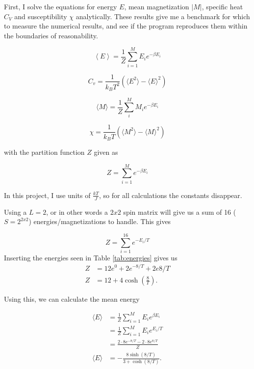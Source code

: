 \documentclass[10pt,showpacs,preprintnumbers,footinbib,amsmath,amssymb,aps,prl,twocolumn,groupedaddress,superscriptaddress,showkeys]{revtex4-1}
\newcommand{\suml}[2]{\sum\limits_{#1}^{#2}}
\newcommand{\Exp}[1]{e^{#1}}
\begin{document}
First, I solve the equations for energy $E$, mean magnetization $|M|$, specific heat $C_V$ and susceptibility $\chi$ analytically. These results give me a benchmark for which to measure the numerical results, and see if the program reproduces them within the boundaries of reasonability.

\begin{equation}
\left\langle E \right\rangle = \frac{1}{Z} \suml{i = 1}{M} E_i\Exp{-\beta E_i}
\label{eq:<E>}
\end{equation}

\begin{equation}
C_v = \frac{1}{k_B T^2}\left( \langle E^2 \rangle - \langle E \rangle ^2  \right)
\label{eq:C_V}
\end{equation}

\begin{equation}
\langle M \rangle = \frac{1}{Z}\suml{i}{M}M_i\Exp{-\beta E_i}
\label{eq:<M>}
\end{equation}

\begin{equation}
\chi = \frac{1}{k_B T}\left( \langle M^2 \rangle - \langle M \rangle ^2  \right)
\label{eq:chi}
\end{equation}

with the partition function $Z$ given as

\begin{equation}
Z = \sum_{i=1}^{M} e^{-\beta E_i}
\end{equation}



In this project, I use units of $\frac{k T}{J}$, so for all calculations the constants disappear.

Using a $L = 2$, or in other words a $2x2$ spin matrix will give us a sum of 16 ($S = 2^{2x2}$) energies/magnetizations to handle. This gives

$$
Z = \sum_{i=1}^{16} e^{-E_i/T}
$$
Inserting the energies seen in Table \ref{tab:energies} gives us
\begin{align*}
Z&= 12e^{0}+2e^{-8/T}+2e{8/T}\\
Z&= 12 + 4\cosh(\frac{8}{T}).
\end{align*}

Using this, we can calculate the mean energy

\begin{align*}
\langle E\rangle &=  \frac{1}{Z} \sum_{i=1}^{M} E_i e^{\beta E_i}\\
&= \frac{1}{Z} \sum_{i=1}^{M} E_i e^{E_i/T}\\
&= \frac{2\cdot 8e^{-8/T} -2\cdot 8e^{8/T}}{Z}\\
\langle E\rangle &= -\frac{8\sinh(8/T)}{3+\cosh(8/T)}.
\end{align*}
\end{document}
